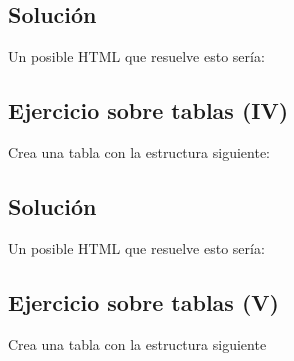 \documentclass[letterpaper,10pt,spanish]{sphinxmanual}
\begin{document}
\subsection{Solución}
\label{tema2:id2}
Un posible HTML que resuelve esto sería:


\subsection{Ejercicio sobre tablas (IV)}
\label{tema2:ejercicio-sobre-tablas-iv}
Crea una tabla con la estructura siguiente:



\subsection{Solución}
\label{tema2:id3}
Un posible HTML que resuelve esto sería:


\subsection{Ejercicio sobre tablas (V)}
\label{tema2:ejercicio-sobre-tablas-v}
Crea una tabla con la estructura siguiente
\begin{figure}[htbp]
\centering

\noindent{}
\end{figure}
\end{document}
